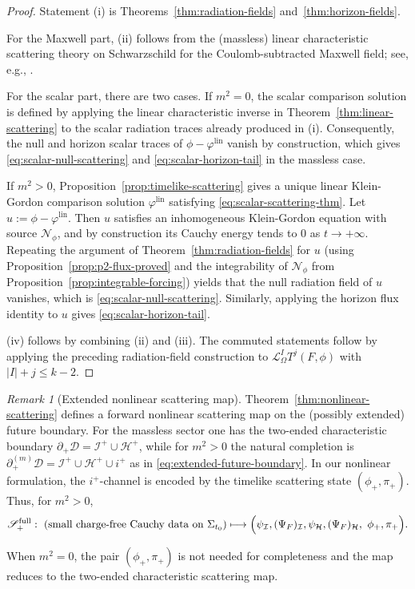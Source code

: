 \documentclass[11pt]{article}
\numberwithin{equation}{section}
\theoremstyle{plain}
\theoremstyle{definition}
\theoremstyle{remark}
\newtheorem{remark}{Remark}[section]
\newcommand{\D}{\mathcal{D}}
\begin{document}
\begin{proof}
Statement (i) is Theorems~\ref{thm:radiation-fields} and~\ref{thm:horizon-fields}.

For the Maxwell part, (ii) follows from the (massless) linear characteristic scattering theory on Schwarzschild for the Coulomb-subtracted Maxwell field; see, e.g., \cite{Blue,Ander1}.

For the scalar part, there are two cases.  If $m^{2}=0$, the scalar comparison solution is defined by applying the linear characteristic inverse in Theorem~\ref{thm:linear-scattering} to the scalar radiation traces already produced in (i).  Consequently, the null and horizon scalar traces of $\phi-\varphi^{\mathrm{lin}}$ vanish by construction, which gives \eqref{eq:scalar-null-scattering} and \eqref{eq:scalar-horizon-tail} in the massless case.

If $m^{2}>0$, Proposition~\ref{prop:timelike-scattering} gives a unique linear Klein-Gordon comparison solution $\varphi^{\mathrm{lin}}$ satisfying \eqref{eq:scalar-scattering-thm}.  Let $u:=\phi-\varphi^{\mathrm{lin}}$.  Then $u$ satisfies an inhomogeneous Klein-Gordon equation with source $\mathcal N_{\phi}$, and by construction its Cauchy energy tends to $0$ as $t\to+\infty$.  Repeating the argument of Theorem~\ref{thm:radiation-fields} for $u$ (using Proposition~\ref{prop:p2-flux-proved} and the integrability of $\mathcal N_{\phi}$ from Proposition~\ref{prop:integrable-forcing}) yields that the null radiation field of $u$ vanishes, which is \eqref{eq:scalar-null-scattering}.  Similarly, applying the horizon flux identity to $u$ gives \eqref{eq:scalar-horizon-tail}.

(iv) follows by combining (ii) and (iii).
The commuted statements follow by applying the preceding radiation-field construction to $\mathcal L_{\Omega}^{I}T^{j}(F,\phi)$ with $|I|+j\le k-2$.
\end{proof}

\begin{remark}[Extended nonlinear scattering map]\label{rem:scattering-map}
Theorem~\ref{thm:nonlinear-scattering} defines a forward nonlinear scattering map on the (possibly extended) future boundary.
For the massless sector one has the two-ended characteristic boundary $\partial_{+}\D=\mathcal I^{+}\cup\mathcal H^{+}$, while for $m^{2}>0$ the natural completion is $\partial_{+}^{(m)}\D=\mathcal I^{+}\cup\mathcal H^{+}\cup i^{+}$ as in \eqref{eq:extended-future-boundary}.
In our nonlinear formulation, the $i^{+}$-channel is encoded by the timelike scattering state $(\phi_{+},\pi_{+})$.
Thus, for $m^{2}>0$,
\begin{equation}
\mathscr S_{+}^{\mathrm{full}}:\ \text{(small charge-free Cauchy data on $\Sigma_{t_0}$)}\longmapsto
\Bigl(\psi_{\mathcal I},(\Psi_F)_{\mathcal I},\psi_{\mathcal H},(\Psi_F)_{\mathcal H},\ \phi_{+},\pi_{+}\Bigr).
\end{equation}

When $m^{2}=0$, the pair $(\phi_{+},\pi_{+})$ is not needed for completeness and the map reduces to the two-ended characteristic scattering map.
\end{remark}
\end{document}
